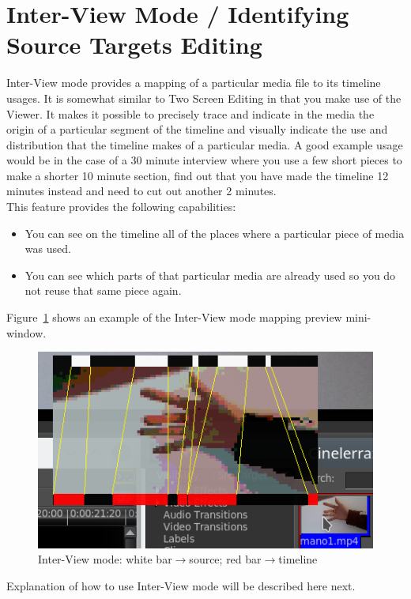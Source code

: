 \section{Inter-View Mode / Identifying Source Targets Editing}%
\label{sec:inter-view_identifying_source_target_editing}

Inter-View mode provides a mapping of a particular media file to its timeline usages. It is somewhat similar to Two Screen Editing in that you make use of the Viewer. It makes it possible to precisely trace and indicate in the media the origin of a particular segment of the timeline and visually indicate the use and distribution that the timeline makes of a particular media.   A good example usage would be in the case of a 30 minute interview where you use a few short pieces to make a shorter 10 minute section, find out that you have made the timeline 12 minutes instead and need to cut out another 2 minutes. \\
This feature provides the following capabilities:
\begin{itemize}
    \item You can see on the timeline all of the places where a particular piece of media was used.
    \item You can see which parts of that particular media are already used so you do not reuse that same 
    piece again.
\end{itemize}
Figure~\ref{fig:inter-view01} shows an example of the Inter-View mode mapping preview mini-window.

\begin{figure}[htpb]
    \centering
    \includegraphics[width=0.8\linewidth]{images/inter-view01.png}
    \caption{Inter-View mode: white bar$\rightarrow$source; red bar$\rightarrow$timeline}
    \label{fig:inter-view01}
\end{figure}

Explanation of how to use Inter-View mode will be described here next.

